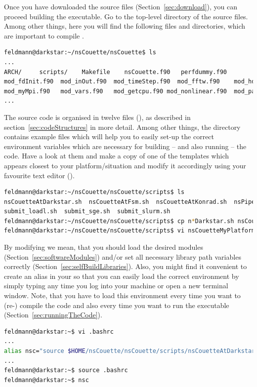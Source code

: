 \documentclass[a4paper, 11pt, DIV=11]{scrartcl}
\begin{document}
Once you have downloaded the source files (Section~\ref{sec:download}),
you can proceed building the executable. Go to the top-level directory
of the source files. Among other things, here you will find the following
files and directories, which are important to compile \nsc.
\begin{lstlisting}[language=bash]
feldmann@darkstar:~/nsCouette/nsCouette$ ls
...
ARCH/     scripts/    Makefile    nsCouette.f90   perfdummy.f90
mod_fdInit.f90  mod_inOut.f90  mod_timeStep.f90  mod_fftw.f90    mod_hdf5io.f90
mod_myMpi.f90   mod_vars.f90   mod_getcpu.f90 mod_nonlinear.f90  mod_params.f90
...
\end{lstlisting}
The source code is organised in twelve \fortran files (), as
described in section~\ref{sec:codeStructures} in more detail. Among other things,
the directory  contains example files which will help you
to easily set-up the correct environment variables which are necessary for
building -- and also running -- the code. Have a look at them and make a
copy of one of the templates which appears closest to your platform/situation
and modify it accordingly using your favourite text editor (\eg {}).
\begin{lstlisting}[language=bash]
feldmann@darkstar:~/nsCouette/nsCouette/scripts$ ls 
nsCouetteAtDarkstar.sh  nsCouetteAtFsm.sh  nsCouetteAtKonrad.sh  nsPipeAtKonrad.sh 
submit_loadl.sh  submit_sge.sh  submit_slurm.sh
feldmann@darkstar:~/nsCouette/nsCouette/scripts$ cp n*Darkstar.sh nsCouetteAtMyPlatform.sh
feldmann@darkstar:~/nsCouette/nsCouette/scripts$ vi nsCouetteMyPlatform.sh
\end{lstlisting}
By modifying we mean, that you should load the desired modules
(Section~\ref{sec:softwareModules}) and/or set all necessary
library path variables correctly (Section~\ref{sec:selfBuildLibraries}).
Also, you might find it convenient to create an alias in your
 so that you can easily load the correct environment
by simply typing  any time you log into your machine
or open a new terminal window. Note, that you have to load this
environment every time you want to (re-) compile the code and
also every time you want to run the executable (Section~\ref{sec:runningTheCode}).
\begin{lstlisting}[language=bash]
feldmann@darkstar:~$ vi .bashrc
...
alias nsc="source $HOME/nsCouette/nsCouette/scripts/nsCouetteAtDarkstar.sh"
...
feldmann@darkstar:~$ source .bashrc
feldmann@darkstar:~$ nsc
\end{lstlisting}
\end{document}
